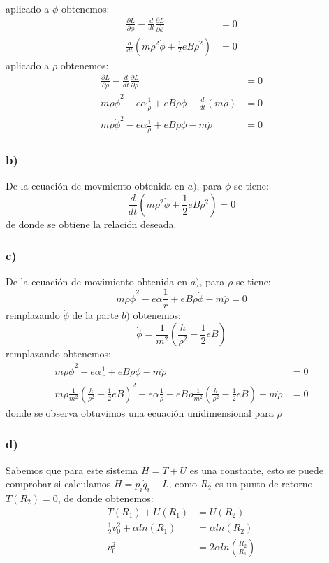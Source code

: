\documentclass{article}
\begin{document}
\begin{tcolorbox}[breakable]
\begin{align*}
    \end{align*}
    aplicado a $\phi$ obtenemos:
    \begin{align*}
        \frac{\partial L}{\partial \phi} - \frac{d}{dt}\frac{\partial L}{\partial \dot{\phi}} &= 0 \\
        \frac{d}{dt}(m\rho^2\dot{\phi} + \frac{1}{2}eB\rho^2) &= 0
     \end{align*}
     aplicado a $\rho$ obtenemos:
    \begin{align*}
        \frac{\partial L}{\partial \rho} - \frac{d}{dt}\frac{\partial L}{\partial \dot{\rho}} &= 0 \\
        m\rho \dot{\phi}^2 - e\alpha \frac{1}{\rho} + eB\rho \dot{\phi} - \frac{d}{dt}(m\dot{\rho}) &= 0 \\
        m\rho \dot{\phi}^2 - e\alpha \frac{1}{\rho} + eB\rho \dot{\phi} - m\ddot{\rho} &= 0 
    \end{align*}
    \subsubsection*{b)}
    De la ecuación de movmiento obtenida en $a)$, para $\phi$ se tiene:
    \[ \frac{d}{dt}(m\rho^2\dot{\phi} + \frac{1}{2}eB\rho^2) = 0 \]
    de donde se obtiene la relación deseada.
    \subsubsection*{c)}
    De la ecuación de movimiento obtenida en $a)$, para $\rho$ se tiene:
    \[m\rho \dot{\phi}^2 - e\alpha \frac{1}{r} + eB\rho \dot{\phi} - m\ddot{\rho} = 0 \]
    remplazando $\dot{\phi}$ de la parte $b)$ obtenemos:
    \[ \dot{\phi} = \frac{1}{m^2}\left( \frac{h}{\rho^2} - \frac{1}{2}eB \right) \]
    remplazando obtenemos:
    \begin{align*}
        m\rho \dot{\phi}^2 - e\alpha \frac{1}{r} + eB\rho \dot{\phi} - m\ddot{\rho} &= 0 \\
        m\rho \frac{1}{m^2}\left( \frac{h}{\rho^2} - \frac{1}{2}eB \right)^2 
        - e\alpha \frac{1}{\rho} 
        + eB\rho\frac{1}{m^2}\left( \frac{h}{\rho^2} - \frac{1}{2}eB \right) - m\ddot{\rho} &= 0
    \end{align*}
    donde se observa obtuvimos una ecuación unidimensional para $\rho$
    \subsubsection*{d)}
    Sabemos que para este sistema $H=T+U$ es una constante, esto se puede comprobar si calculamos $H = p_i\dot{q}_i - L$,
     como $R_2$ es un punto de retorno $T(R_2)=0$, de donde obtenemos:
    \begin{align*}
        T(R_1) + U(R_1) &= U(R_2) \\
        \frac{1}{2}v_0^2 + \alpha ln(R_1) &= \alpha ln(R_2) \\
        v_0^2 &= 2\alpha ln\left(\frac{R_2}{R_1}\right)
    \end{align*}

\end{tcolorbox}
\end{document}
